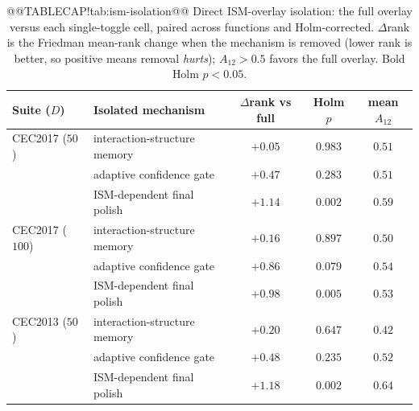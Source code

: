 \documentclass[10pt,a4paper]{article}
\begin{document}
\begin{table}[H]
\caption{@@TABLECAP!tab:ism-isolation@@ Direct ISM-overlay isolation: the full overlay versus each
single-toggle cell, paired across functions and Holm-corrected. $\Delta$rank is
the Friedman mean-rank change when the mechanism is removed (lower rank is
better, so positive means removal \emph{hurts}); $A_{12} > 0.5$ favors the full
overlay.  Bold Holm $p < 0.05$.}\label{tab:ism-isolation}
\small\centering
\begin{tabular}{llccc}
\toprule
Suite ($D$) & Isolated mechanism & $\Delta$rank vs full & Holm $p$ & mean $A_{12}$\\
\midrule
CEC2017 ($50$)  & interaction-structure memory & $+0.05$ & $0.983$          & $0.51$\\
                & adaptive confidence gate     & $+0.47$ & $0.283$          & $0.51$\\
                & ISM-dependent final polish   & $+1.14$ & $\mathbf{0.002}$ & $0.59$\\
\addlinespace
CEC2017 ($100$) & interaction-structure memory & $+0.16$ & $0.897$          & $0.50$\\
                & adaptive confidence gate     & $+0.86$ & $0.079$          & $0.54$\\
                & ISM-dependent final polish   & $+0.98$ & $\mathbf{0.005}$ & $0.53$\\
\addlinespace
CEC2013 ($50$)  & interaction-structure memory & $+0.20$ & $0.647$          & $0.42$\\
                & adaptive confidence gate     & $+0.48$ & $0.235$          & $0.52$\\
                & ISM-dependent final polish   & $+1.18$ & $\mathbf{0.002}$ & $0.64$\\
\bottomrule
\end{tabular}
\end{table}
\end{document}
